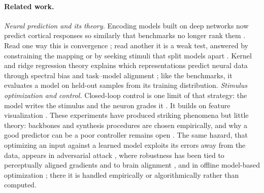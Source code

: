 
\paragraph{Related work.}
{\color{red}\textit{Neural prediction and its theory.}}
Encoding models built on deep networks now predict cortical responses so similarly that benchmarks no longer rank them \citep{yamins2014performanceOptimized,guclu2015deepGradientComplexity,cadena2019deepConvolutionalV1,schrimpf2018brainscore,conwell2024inductiveBiases}. Read one way this is convergence \citep{huh2024platonicRepresentationHypothesis,kapoor2026convergentLearning}; read another it is a weak test, answered by constraining the mapping \citep{prince2024sparsePositiveAlignment} or by seeking stimuli that split models apart \citep{golan2020controversialStimuli,feather2023modelMetamers,rajalingham2018large,geirhos2019imagenetTextureBias}. {\color{red}Kernel and ridge regression theory explains which representations predict neural data through spectral bias and task--model alignment \citep{canatar2021spectralBias,canatar2023spectralTheory}; like the benchmarks, it evaluates a model on held-out samples from its training distribution.}
{\color{red}\textit{Stimulus optimization and control.}}
Closed-loop control is one limit of that strategy: the model writes the stimulus and the neuron grades it \citep{ponce2019evolvingImages,xiao2020xdream,bashivan2019neuralPopulationControl,walker2019inceptionLoops,prince2026parametric}. {\color{red}It builds on feature visualization \citep{olah2017feature,hamblin2024feature,fel2023magnitudeConstrainedOptimization}. These experiments have produced striking phenomena but little theory: backbones and synthesis procedures are chosen empirically, and why a good predictor can be a poor controller remains open \citepPW. The same hazard, that optimizing an input against a learned model exploits its errors away from the data, appears in adversarial attack \citep{nguyen2015deepNeuralFooled,goodfellow2015explainingAdversarial,madry2018towardsResistant}, where robustness has been tied to perceptually aligned gradients and to brain alignment \citep{santurkar2019imageSynthesisRobust,guo2022adversariallyTrainedNeuralRepresentations,dapello2020simulatingV1,taori2020measuring}, and in offline model-based optimization \citep{trabucco2021conservative}; there it is handled empirically or algorithmically rather than computed.}
